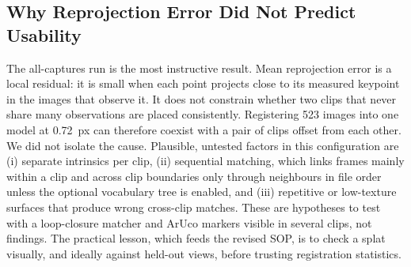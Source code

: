 \documentclass[conference]{IEEEtran}
\begin{document}
\begin{table}[!htb]
\centering
\footnotesize
\caption{Comparison of the Two Reconstruction Runs}
\label{tab:compare}
\end{table}

\subsection{Why Reprojection Error Did Not Predict Usability}
The all-captures run is the most instructive result. Mean reprojection error is a local residual: it is small when each point projects close to its measured keypoint in the images that observe it. It does not constrain whether two clips that never share many observations are placed consistently. Registering 523 images into one model at 0.72~px can therefore coexist with a pair of clips offset from each other. We did not isolate the cause. Plausible, untested factors in this configuration are (i) separate intrinsics per clip, (ii) sequential matching, which links frames mainly within a clip and across clip boundaries only through neighbours in file order unless the optional vocabulary tree is enabled, and (iii) repetitive or low-texture surfaces that produce wrong cross-clip matches. These are hypotheses to test with a loop-closure matcher and ArUco markers visible in several clips, not findings. The practical lesson, which feeds the revised SOP, is to check a splat visually, and ideally against held-out views, before trusting registration statistics.
\end{document}
